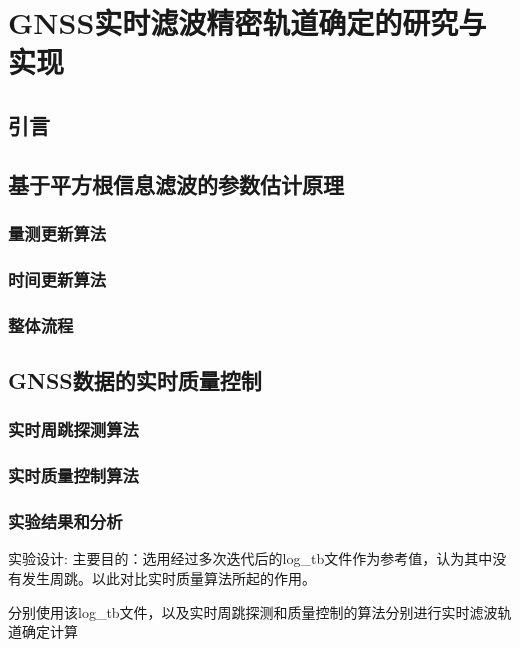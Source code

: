 
\chapter{GNSS实时滤波精密轨道确定的研究与实现}

\section{引言}

\section{基于平方根信息滤波的参数估计原理}

\subsection{量测更新算法}

\subsection{时间更新算法}

\subsection{整体流程}

\section{GNSS数据的实时质量控制}

\subsection{实时周跳探测算法}

\subsection{实时质量控制算法}

\subsection{实验结果和分析}

实验设计:
主要目的：选用经过多次迭代后的log_tb文件作为参考值，认为其中没有发生周跳。以此对比实时质量算法所起的作用。

分别使用该log_tb文件，以及实时周跳探测和质量控制的算法分别进行实时滤波轨道确定计算

